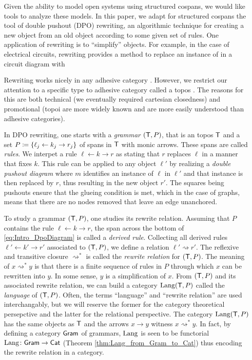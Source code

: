 \documentclass{amsart}
\begin{document}
Given the ability to model open systems using
structured cospans, we would like tools to analyze
these models. In this paper, we adapt for
structured cospans the tool of double pushout
(DPO) rewriting, an algorithmic technique for
creating a new object from an old object according
to some given set of rules. One application of
rewriting is to ``simplify'' objects. For example,
in the case of electrical circuits, rewriting
provides a method to replace an instance of
 in a circuit
diagram with 

Rewriting works nicely in any adhesive category
\cite{LackSobo_Adhesive}. However, we restrict our
attention to a specific type to adhesive category
called a topos \cite{LackSobo_TopsIsAdh}. The
reasons for this are both technical (we eventually
required cartesian closedness) and promotional
(topoi are more widely known and are more easily
understood than adhesive categories).

In DPO rewriting, one starts with a \emph{grammar}
$ ( \mathsf{T},P ) $, that is an topos $ \mathsf{T} $ and a set
$ P \coloneqq \{ \ell_j \leftarrow k_j \to r_j \} $ of spans in $ \mathsf{T} $ with monic arrows. These
spans are called \emph{rules}. We interpet a rule
$ \ell \gets k \to r $ as stating that $ r $
replaces $ \ell $ in a manner that fixes $ k
$. This rule can be applied to any object
$ \ell' $ by realizing a \emph{double pushout
  diagram} 
where $ m $ identifies an instance of $ \ell $ in
$ \ell' $ and that instance is then replaced by
$ r $, thus resulting in the new object $ r'
$. The squares being pushouts ensure that the
glueing condition is met, which in the case of
graphs, means that there are no nodes removed
that leave an edge unanchored.

To study a grammar $ ( \mathsf{T} , P ) $, one studies its
rewrite relation. Assuming that $ P $ contains the
rule $ \ell \gets k \to r $, the span across the
bottom of \eqref{eq:Intro_DpoDiagram} is called a
\emph{derived rule}. Collecting all derived rules
$ \ell' \gets k' \to r' $ associated to
$ ( \mathsf{T},P ) $, we define a relation
$ \ell' \rightsquigarrow r' $.  The reflexive and
transitive closure $ \rightsquigarrow^\ast $ is called
the \emph{rewrite relation} for $ ( \mathsf{T},P ) $.  The
meaning of $ x \rightsquigarrow^\ast y $ is that
there is a finite sequence of rules in $ P $ through
which $ x $ can be rewritten into $ y $.  In some
sense, $ y $ is a simplification of $ x $. From
$ ( \mathsf{T},P ) $ and its associated rewrite relation,
we can build a category $ \mathrm{Lang} ( \mathsf{T},P ) $ called
the \emph{language} of $ (\mathsf{T},P) $. Often, the
terms ``language'' and ``rewrite relation'' are
used interchangably, but we will reserve the
former for the category theoretical persepctive
and the latter for the relational perspective.
The category $ \mathrm{Lang} (\mathsf{T},P) $ has the same objects
as $ \mathsf{T} $ and the arrows $ x \to y $ witness
$ x \rightsquigarrow^\ast y $. In fact, by
defining a category $ \mathsf{Gram} $ of grammars,
$ \mathrm{Lang} $ is seen to be functorial
$ \mathrm{Lang} \colon \mathsf{Gram} \to \mathsf{Cat} $ (Theorem
\ref{thm:Lang_from_Gram_to_Cat}) thus encoding the
rewrite relation in a category.
\end{document}
